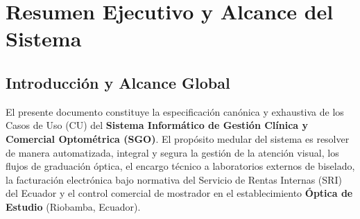 \documentclass[12pt,a4paper]{report}
\begin{document}
\newpage
\tableofcontents
\listoffigures
\listoftables

\newpage
\chapter{Resumen Ejecutivo y Alcance del Sistema}

\section{Introducción y Alcance Global}
El presente documento constituye la especificación canónica y exhaustiva de los Casos de Uso (CU) del \textbf{Sistema Informático de Gestión Clínica y Comercial Optométrica (SGO)}. El propósito medular del sistema es resolver de manera automatizada, integral y segura la gestión de la atención visual, los flujos de graduación óptica, el encargo técnico a laboratorios externos de biselado, la facturación electrónica bajo normativa del Servicio de Rentas Internas (SRI) del Ecuador y el control comercial de mostrador en el establecimiento \textbf{Óptica de Estudio} (Riobamba, Ecuador).
\end{document}
